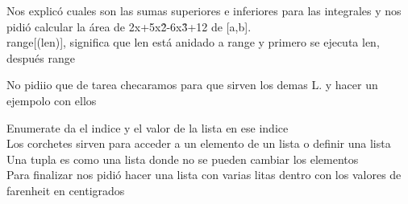 \documentclass{book}
\begin{document}
\begin{enumerate}
\begin{enumerate}
Nos explicó cuales son las sumas superiores e inferiores para las integrales y nos pidió calcular la área de 2x+5x\^2-6x\^3+12
de [a,b].\\

\color{blue}range[(len)]\color{black}, significa que len está anidado a range y primero se ejecuta len, después range

No pidiio que de tarea checaramos para que sirven los demas L. y hacer un ejempolo con ellos

\color{blue}Enumerate \color{black} da el indice y el valor de la lista en ese indice\\
Los corchetes sirven para acceder a un elemento de un lista o definir una lista\\
Una \color{red}tupla \color{black} es como una lista donde no se pueden cambiar los elementos \\
Para finalizar nos pidió hacer una lista con varias litas dentro con los valores de farenheit en centigrados\\


\end{enumerate}
\end{enumerate}
\end{document}
